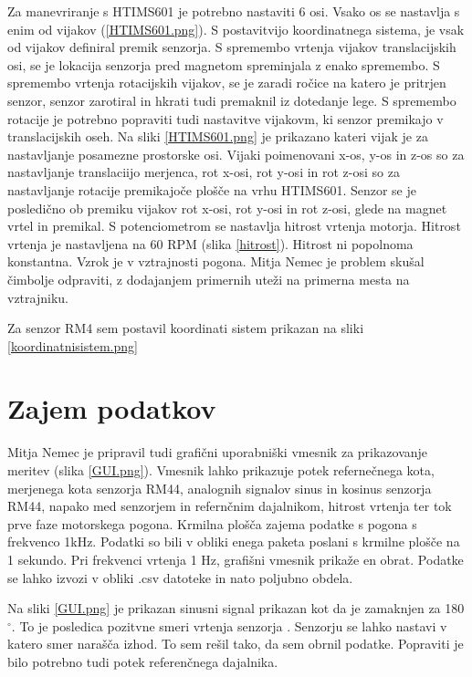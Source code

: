 Za manevriranje s HTIMS601 je potrebno nastaviti 6 osi.
Vsako os se nastavlja s enim od vijakov (\ref{HTIMS601.png}).
S postavitvijo koordinatnega sistema, je vsak od vijakov definiral premik senzorja. 
S spremembo vrtenja vijakov translacijskih osi, se je lokacija senzorja pred magnetom spreminjala z enako spremembo. S spremembo vrtenja rotacijskih vijakov, se je zaradi ročice na katero je pritrjen senzor, senzor zarotiral in hkrati tudi premaknil iz dotedanje lege. S spremembo rotacije je potrebno popraviti tudi nastavitve vijakovm, ki senzor premikajo v translacijskih oseh.
Na sliki \ref{HTIMS601.png} je prikazano kateri vijak je za nastavljanje posamezne prostorske osi. Vijaki poimenovani x-os, y-os in z-os so za nastavljanje translaciijo merjenca, rot x-osi, rot y-osi in rot z-osi so za nastavljanje rotacije premikajoče plošče na vrhu HTIMS601.
Senzor se je posledično ob premiku vijakov rot x-osi, rot y-osi in rot z-osi, glede na magnet vrtel in premikal.
S potenciometrom se nastavlja hitrost vrtenja motorja.
Hitrost vrtenja je nastavljena na 60 RPM (slika \ref{hitrost}). Hitrost ni popolnoma konstantna. Vzrok je v vztrajnosti pogona. Mitja Nemec je problem skušal čimbolje odpraviti, z dodajanjem primernih uteži na primerna mesta na vztrajniku.

Za senzor RM4 sem postavil koordinati sistem prikazan na sliki \ref{koordinatnisistem.png}
 


\section{Zajem podatkov}

Mitja Nemec je pripravil tudi grafični uporabniški vmesnik za prikazovanje meritev (slika \ref{GUI.png}).
Vmesnik lahko prikazuje potek refernečnega kota, merjenega kota senzorja RM44, analognih signalov sinus in kosinus senzorja RM44, napako med senzorjem in refernčnim dajalnikom, hitrost vrtenja ter tok prve faze motorskega pogona.
Krmilna plošča zajema podatke s pogona s frekvenco 1kHz. Podatki so bili v obliki enega paketa poslani s krmilne plošče na 1 sekundo. Pri frekvenci vrtenja 1 Hz, grafišni vmesnik prikaže en obrat.
Podatke se lahko izvozi v obliki .csv datoteke in nato poljubno obdela.

Na sliki  \ref{GUI.png} je prikazan sinusni signal prikazan kot da je zamaknjen za 180$\mathrm{^\circ}$. To je posledica pozitvne smeri vrtenja senzorja \cite{RM44}. Senzorju se lahko nastavi v katero smer narašča izhod. To sem rešil tako, da sem obrnil podatke. Popraviti je bilo potrebno tudi potek referenčnega dajalnika.


